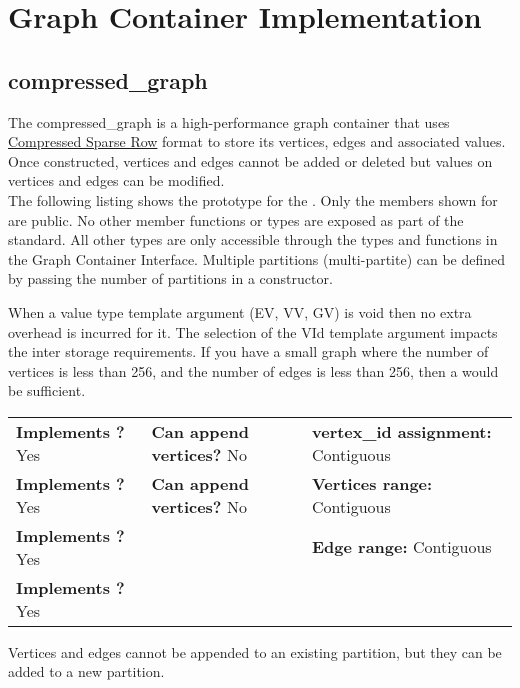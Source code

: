 
\chapter{Graph Container Implementation}

\section{compressed\_graph}
The compressed\_graph is a high-performance graph container that uses \href{https://en.wikipedia.org/wiki/Sparse_matrix#Compressed_sparse_row_\%28CSR\%2C_CRS_or_Yale_format\%29}{Compressed Sparse Row} format to store its vertices, edges and associated values. Once constructed, vertices and edges cannot be added or deleted but values on vertices and edges can be modified.
\\

The following listing shows the prototype for the . Only the members shown for  are public. 
No other member functions or types are exposed as part of the standard. All other types are only accessible through the types and functions 
in the Graph Container Interface. Multiple partitions (multi-partite) can be defined by passing the number of partitions in a constructor.

When a value type template argument (EV, VV, GV) is void then no extra overhead is incurred for it. 
The selection of the VId template argument impacts the inter storage requirements. If you have a small 
graph where the number of vertices is less than 256, and the number of edges is less than 256, 
then a  would be sufficient.

\begin{table}[h]
    \setcellgapes{3pt}
    \makegapedcells
    \centering
    \begin{tabular}{|P{0.35\textwidth}|P{0.30\textwidth}|P{0.35\textwidth}|}
    \hline
    \textbf{Implements ?} Yes & \textbf{Can append vertices?} No & \textbf{vertex\_id assignment:} Contiguous\\
    \textbf{Implements ?} Yes & \textbf{Can append vertices?} No & \textbf{Vertices range:} Contiguous \\
    \textbf{Implements ?} Yes &  & \textbf{Edge range:} Contiguous \\
    \textbf{Implements ?} Yes &  & \\
    \hline
    \end{tabular}
    \label{tab:compressed_graph_summary}
\end{table}
Vertices and edges cannot be appended to an existing partition, but they can be added to a new partition.

